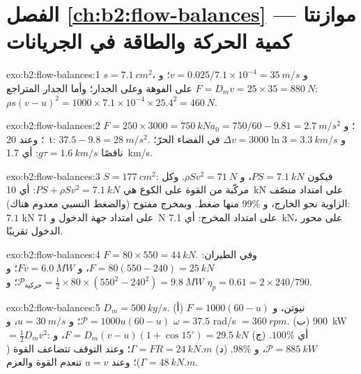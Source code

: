 \section*{الفصل \ref{ch:b2:flow-balances} --- موازنتا كمية الحركة والطاقة في الجريانات}

\begin{solution}{exo:b2:flow-balances:1}
$s = \qty{7.1}{cm^2}$، و $v = 0.025/7.1 \times 10^{-4} = \qty{35}{m/s}$؛ و $F = D_mv = 25
\times 35 = \qty{880}{N}$ على الفوهة وعلى الجدار؛ وأما الجدار المتراجع: $\rho s(v -
u)^2 = 1000 \times 7.1 \times 10^{-4} \times 25.4^2 = \qty{460}{N}$.
\end{solution}

\begin{solution}{exo:b2:flow-balances:2}
$F = 250 \times 3000 = \qty{750}{kN}$؛ و $a_0 = 750/60 - 9.81 = \qty{2.7}{m/s^2}$؛ وعند
\qty{20}{t}: $37.5 - 9.8 = \qty{28}{m/s^2}$. و $\Delta v = 3000\ln3 = \qty{3.3}{km/s}$ في
الفضاء الحرّ؛ ناقصًا $g\tau = \qty{1.6}{km/s}$: أي \qty{1.7}{km/s}.
\end{solution}

\begin{solution}{exo:b2:flow-balances:3}
$S = \qty{177}{cm^2}$: فيكون $PS = \qty{7.1}{kN}$، و $\rho Sv^2 = \qty{71}{N}$. وكل مركّبة
من القوة على الكوع هي $PS + \rho Sv^2 = \qty{7.1}{kN}$: أي \qty{10}{kN} على امتداد
منصّف الزاوية نحو الخارج، و $99\%$ منها ضغط. وبمخرج مفتوح (والضغط النسبي
معدوم هناك): $7.1$ kN على امتداد جهة الدخول و \qty{71}{N} على امتداد
المخرج: أي \qty{7.1}{kN}، على محور الدخول تقريبًا.
\end{solution}

\begin{solution}{exo:b2:flow-balances:4}
$F = 80 \times 550 = \qty{44}{kN}$. وفي الطيران: $F = 80(550 - 240) = \qty{25}{kN}$، و $Fv =
\qty{6.0}{MW}$؛ و $\mathcal P_{\text{حركية}} = \tfrac12 \times 80 \times (550^2 - 240^2) =
\qty{9.8}{MW}$؛ و $\eta_p = 0.61 = 2 \times 240/790$.
\end{solution}

\begin{solution}{exo:b2:flow-balances:5}
$D_m = \qty{500}{kg/s}$. (أ) $F = 1000(60 - u)$ نيوتن، و $\mathcal P = 1000u(60 - u)$؛ و $u =
\qty{30}{m/s}$، و $\omega = 37.5$ rad/s $= \qty{360}{rpm}$. (ب) \qty{900}{kW} $=
\tfrac12D_mv^2$: أي $100\%$. (ج) $F = D_m(v - u)(1 + \cos15^\circ) = \qty{29.5}{kN}$، و $\mathcal P
= \qty{885}{kW}$، و $98\%$. (د) $\Gamma = FR = \qty{24}{kN.m}$؛ وعند التوقف تتضاعف
القوة ($\Gamma = \qty{48}{kN.m}$)؛ وعند $u = v$ تنعدم القوة والعزم.
\end{solution}

